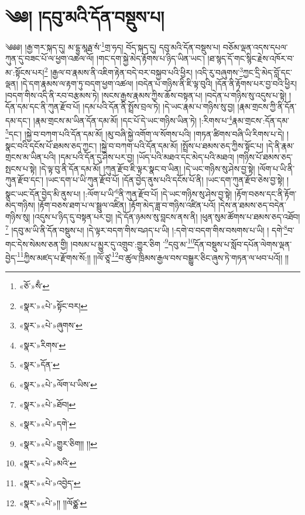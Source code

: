 \chapter{༄༅། །དབུ་མའི་དོན་བསྡུས་པ།}༄༅༅། །རྒྱ་གར་སྐད་དུ། མ་དྷྱ་མཱརྠ་སཾ་\footnote{«ཅོ་»སྃ་}གྲ་ཧད། བོད་སྐད་དུ། དབུ་མའི་དོན་བསྡུས་པ། བཅོམ་ལྡན་འདས་དཔལ་ཀུན་དུ་བཟང་པོ་ལ་ཕྱག་འཚལ་ལོ། །གང་དག་སྐྱེ་མེད་རྟོགས་པ་ཉིད་ཡིན་ཡང་། །ཐ་སྙད་དོ་གང་སྙིང་རྗེས་འཁོར་བ་མ་:སྟོངས་པར།\footnote{«སྣར་»«པེ་»སྟོང་བར།} །རྒྱལ་བ་རྣམས་ནི་འཇིག་རྟེན་བདེ་བར་བསྐྱབ་པའི་ཕྱིར། །འདི་རུ་བཞུགས་\footnote{«སྣར་»«པེ་»ཞུགས་}ཀྱང་དྲི་མེད་བློ་དང་ལྡན། །དེ་དག་རྣམས་ལ་རྟག་ཏུ་བདག་ཕྱག་འཚལ། །བདེན་པ་གཉིས་ནི་ཇི་ལྟ་བུའི། །དོན་ནི་རྟོགས་པར་བྱ་བའི་ཕྱིར། །བདག་གིས་འདི་ནི་རབ་བརྩམས་ཏེ། །སངས་རྒྱས་རྣམས་ཀྱིས་ཆོས་བསྟན་པ། །བདེན་པ་གཉིས་སུ་འདུས་པ་སྟེ། །དོན་དམ་དང་ནི་ཀུན་རྫོབ་པོ། །དམ་པའི་དོན་ནི་སྤྲོས་བྲལ་ཏེ། །དེ་ཡང་རྣམ་པ་གཉིས་སུ་བྱ། །རྣམ་གྲངས་ཀྱི་ནི་དོན་དམ་དང་། །རྣམ་གྲངས་མ་ཡིན་དོན་དམ་མོ། །དང་པོ་དེ་ཡང་གཉིས་ཡིན་ཏེ། །:རིགས་པ་\footnote{«སྣར་»རིགས་}རྣམ་གྲངས་:དོན་དམ་\footnote{«སྣར་»དོན་}དང་། །སྐྱེ་བ་བཀག་པའི་དོན་དམ་མོ། །མུ་བཞི་སྐྱེ་འགོག་ལ་སོགས་པའི། །གཏན་ཚིགས་བཞི་ཡི་རིགས་པ་དེ། །སྣང་བའི་དངོས་པོ་ཐམས་ཅད་ཀྱང་། །སྐྱེ་བ་བཀག་པའི་དོན་དམ་མོ། །སྤྲོས་པ་ཐམས་ཅད་ཀྱིས་སྟོང་པ། །དེ་ནི་རྣམ་གྲངས་མ་ཡིན་པའི། །དམ་པའི་དོན་དུ་ཤེས་པར་བྱ། །ཡོད་པའི་མཐའ་དང་མེད་པའི་མཐའ། །གཉིས་པོ་ཐམས་ཅད་སྤངས་པ་སྟེ། །དེ་ལྟ་བུ་ནི་དོན་དམ་མོ། །ཀུན་རྫོབ་ཇི་ལྟར་སྣང་བ་ཡིན། །དེ་ཡང་གཉིས་སུ་ཤེས་བྱ་སྟེ། །ལོག་པ་ཡི་ནི་ཀུན་རྫོབ་དང་། །ཡང་དག་པ་ཡི་ཀུན་རྫོབ་པོ། །དོན་བྱེད་ནུས་པའི་དངོས་པོ་ནི། །ཡང་དག་ཀུན་རྫོབ་ཅེས་བྱ་སྟེ། །སྣང་ཡང་དོན་བྱེད་མི་ནུས་པ། །:ལོག་པ་ཡི་\footnote{«སྣར་»«པེ་»ལོག་པ་ཡིས་}ནི་ཀུན་རྫོབ་པོ། །དེ་ཡང་གཉིས་སུ་ཤེས་བྱ་སྟེ། །རྟོག་བཅས་དང་ནི་རྟོག་མེད་གཉིས། །རྟོག་བཅས་ཐག་པ་ལ་སྦྲུལ་འཛིན། །རྟོག་མེད་ཟླ་བ་གཉིས་འཛིན་པའོ། །དེས་ན་ཐམས་ཅད་བདེན་གཉིས་སུ། །འདུས་པ་ཉིད་དུ་བསྟན་པར་བྱ། །དེ་དོན་ཉམས་སུ་བླངས་ནས་ནི། །ཕུན་སུམ་ཚོགས་པ་ཐམས་ཅད་འཐོབ།\footnote{«སྣར་»«པེ་»ཐོབ།} །དབུ་མ་ཡི་ནི་དོན་བསྡུས་པ། །དེ་ལྟར་བདག་གིས་བཤད་པ་ཡི། །:དགེ་བ་བདག་གིས་བསགས་པ་ཡི། །
དགེ་\footnote{«སྣར་»«པེ་»དགེ་}བ་གང་དེས་སེམས་ཅན་གྱི། །བསམ་པ་མྱུར་དུ་འགྲུབ་:གྱུར་ཅིག ་\footnote{«སྣར་»«པེ་»གྱུར་ཅིག།། །།}དབུ་མ་\footnote{«སྣར་»«པེ་»མའི་}དོན་བསྡུས་པ་སློབ་དཔོན་ལེགས་ལྡན་བྱེད་\footnote{«སྣར་»«པེ་»འབྱེད་}ཀྱིས་མཛད་པ་རྫོགས་སོ:།། །།ལོ་ཙཱ་\footnote{«སྣར་»«པེ་»།། །།ལོཙྪ་}བ་ཚུལ་ཁྲིམས་རྒྱལ་བས་བསྒྱུར་ཅིང་ཞུས་ཏེ་གཏན་ལ་ཕབ་པའོ།། །།